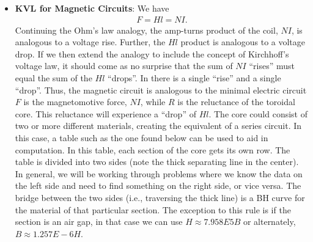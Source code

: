 \documentclass{report}
\begin{document}
\begin{itemize}
            \bigbreak \noindent 
            However, flux is not a flow of magnetic particles and does not carry electricity like current. It is a magnetic field distributed through the core. That field can:
            \begin{itemize}
                \item Store energy.
                \item Exert mechanical force.
                \item Induce an EMF in another coil when the flux changes.
            \end{itemize}
        \item \textbf{KVL for Magnetic Circuits}: We have
            \begin{align*}
                F = Hl = NI
            .\end{align*}
            Continuing the Ohm's law analogy, the amp-turns product of the coil, $NI$, is analogous to a voltage rise. Further, the $Hl$ product is analogous to a voltage drop. If we then extend the analogy to include the concept of Kirchhoff's voltage law, it should come as no surprise that the sum of $NI$ “rises” must equal the sum of the $Hl$ “drops”.
            \bigbreak \noindent 
            In 
            \bigbreak \noindent 
            \bigbreak \noindent 
            there is a single “rise” and a single “drop”. Thus, the magnetic circuit is analogous to the minimal electric circuit
            \bigbreak \noindent 
            \bigbreak \noindent 
            $F$ is the magnetomotive force, $NI$, while $R$ is the reluctance of the toroidal core. This reluctance will experience a “drop” of $Hl$.
            \bigbreak \noindent 
            The core could consist of two or more different materials, creating the equivalent of a series circuit. In this case, a table such as the one found below can be used to aid in computation.
            \bigbreak \noindent 
            In this table, each section of the core gets its own row. The table is divided into two sides (note the thick separating line in the center). In general, we will be working through problems where we know the data on the left side and need to find something on the right side, or vice versa. The bridge between the two sides (i.e., traversing the thick line) is a BH curve for the material of that particular section. The exception to this rule is if the section is an air gap, in that case we can use $H \approx  7.958E5 B$ or alternately, $B \approx  1.257E-6 H$.

\end{itemize}
\end{document}
